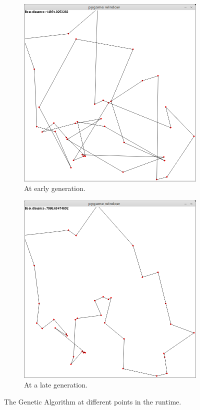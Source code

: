 \documentclass[10pt, a4paper]{article}
\begin{document}
\begin{figure}[h]
\begin{subfigure}[b]{0.49\textwidth}
\includegraphics[width=\textwidth]{img/ga-initial}
\caption{At early generation.}
\end{subfigure}
\begin{subfigure}[b]{0.49\textwidth}
\includegraphics[width=\textwidth]{img/ga-in-progress}
\caption{At a late generation.}
\end{subfigure}
\caption{The Genetic Algorithm at different points in the runtime.}
\label{fig:ga-running}
\end{figure}
\end{document}
